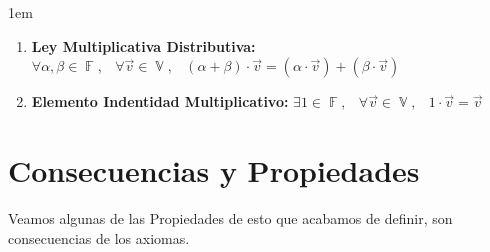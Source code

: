 \documentclass[12pt, fleqn]{report}                             %
\newenvironment{SmallIndentation}[1][0.75em]                    %
        {\begin{adjustwidth}{#1}{}\begin{footnotesize}}             %
        {\end{footnotesize}\end{adjustwidth}}                       %
\DeclareMathOperator \Space     {\quad}                         %
\DeclareMathOperator \MiniSpace {\;}                            %
\theoremstyle{break}                                            %
\DeclareMathOperator \GenericField {\mathbb{F}}                 %
\DeclareMathOperator \VectorSet    {\mathbb{V}}                 %
\begin{document}
\begin{SmallIndentation}[1em]
\begin{enumerate}
                        \item 
                            \textbf{Ley Multiplicativa Distributiva:}
                            $\forall \alpha, \beta \in \GenericField, \MiniSpace
                                \forall \vec{v} \in \VectorSet, \MiniSpace
                                    (\alpha + \beta) \cdot \vec{v} = 
                                            (\alpha \cdot \vec{v}) + (\beta \cdot \vec{v})$

                        \item 
                            \textbf{Elemento Indentidad Multiplicativo:}
                            $\exists 1 \in \GenericField, \MiniSpace
                                \forall \vec{v} \in \VectorSet, \MiniSpace 1 \cdot \vec{v} = \vec{v}$

                    \end{enumerate}

                \end{SmallIndentation}




        \clearpage
        \section{Consecuencias y Propiedades}

            Veamos algunas de las Propiedades de esto que acabamos de definir, son consecuencias de los 
            axiomas.
\end{document}
